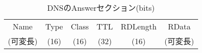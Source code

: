 \begin{table}[htbp]
 \caption{DNSのAnswerセクション(bits)}
 \centering
  \begin{tabular}{|c|c|c|c|c|c|}
    \toprule
		Name & Type & Class & TTL & RDLength & RData\\
		(可変長) & (16) & (16) & (32) & (16) & (可変長)\\
    \bottomrule
  \end{tabular}
 \label{tab:answer-dns}
\end{table}
